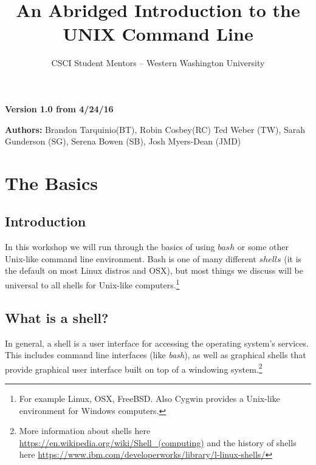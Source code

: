 \documentclass[oneside]{book}
\begin{document}
\title{An Abridged Introduction to the UNIX Command Line}
\author{CSCI Student Mentors \--- Western Washington University}
\date{}

\maketitle
\tableofcontents
\newpage


\begin{versionhistory}
    \begin{center}
        \large{\textbf{Version 1.0 from 4/24/16}}
    \end{center}
    \large{\textbf{Authors:} Brandon Tarquinio(BT), Robin Cosbey(RC)  Ted Weber (TW), Sarah Gunderson (SG), Serena Bowen (SB), Josh Myers-Dean (JMD)}
\end{versionhistory}
\chapter{The Basics}

\section{Introduction}
In this workshop we will run through the basics of using $bash$ or some other Unix-like command line environment. Bash is one of many different  $shells$ (it is the default on most Linux distros and OSX), but most things we discuss will be universal to all shells for Unix-like computers.\footnote{For example Linux, OSX, FreeBSD. Also Cygwin provides a Unix-like environment for Windows computers.} 

\section{What is a shell?}
In general, a shell is a user interface for accessing the operating system's services. This includes command line interfaces (like \textit{bash}), as well as graphical shells that provide graphical user interface built on top of a windowing system.\footnote{More information about shells here \url{https://en.wikipedia.org/wiki/Shell_(computing)} and the history of shells here \url{https://www.ibm.com/developerworks/library/l-linux-shells/}} 
\end{document}
